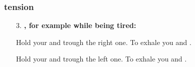
\begin{frame}
\frametitle{ tension}

 
\begin{itemize}
\item[3. ] \textbf{, for example while being tired:}

Hold your  and  trough the right one. To exhale you  and .

Hold your  and  trough the left one. To exhale you  and .
\end{itemize}
\end{frame}